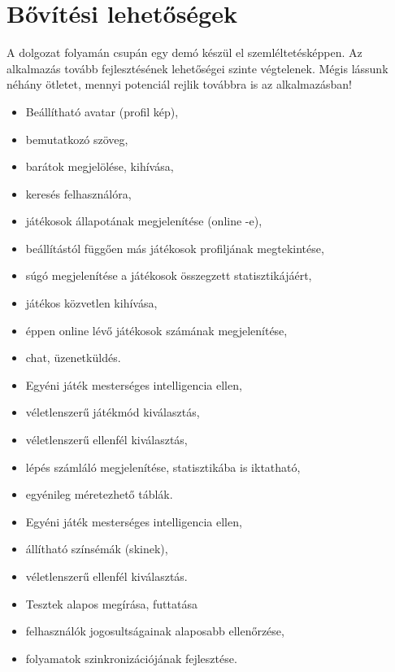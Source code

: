 \chapter{Bővítési lehetőségek}

A dolgozat folyamán csupán egy demó készül el szemléltetésképpen. Az alkalmazás tovább fejlesztésének lehetőségei szinte végtelenek. Mégis lássunk néhány ötletet, mennyi potenciál rejlik továbbra is az alkalmazásban!


\begin{itemize}
	\item Beállítható avatar (profil kép),
	\item bemutatkozó szöveg,
	\item barátok megjelölése, kihívása,
	\item keresés felhasználóra,
	\item játékosok állapotának megjelenítése (online -e),
	\item beállítástól függően más játékosok profiljának megtekintése,
	\item súgó megjelenítése a játékosok összegzett statisztikájáért,
	\item játékos közvetlen kihívása,
	\item éppen online lévő játékosok számának megjelenítése,
	\item chat, üzenetküldés.
\end{itemize}


\begin{itemize}
	\item Egyéni játék mesterséges intelligencia ellen,
	\item véletlenszerű játékmód kiválasztás,
	\item véletlenszerű ellenfél kiválasztás,
	\item lépés számláló megjelenítése, statisztikába is iktatható,
	\item egyénileg méretezhető táblák.
\end{itemize}


\begin{itemize}
	\item Egyéni játék mesterséges intelligencia ellen,
	\item állítható színsémák (skinek),
	\item véletlenszerű ellenfél kiválasztás.
\end{itemize}


\begin{itemize}
	\item Tesztek alapos megírása, futtatása
	\item felhasználók jogosultságainak alaposabb ellenőrzése,
	\item folyamatok szinkronizációjának fejlesztése.
\end{itemize}